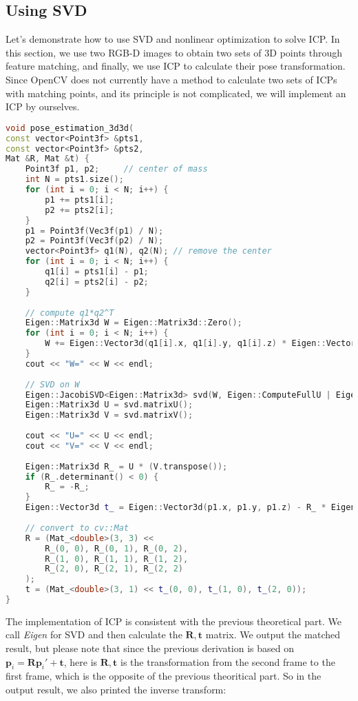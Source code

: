 \subsection{Using SVD}
Let's demonstrate how to use SVD and nonlinear optimization to solve ICP. In this section, we use two RGB-D images to obtain two sets of 3D points through feature matching, and finally, we use ICP to calculate their pose transformation. Since OpenCV does not currently have a method to calculate two sets of ICPs with matching points, and its principle is not complicated, we will implement an ICP by ourselves.
\begin{lstlisting}[language=c++,caption=slambook2/ch7/pose\_estimation\_3d3d.cpp (part)]
void pose_estimation_3d3d(
const vector<Point3f> &pts1,
const vector<Point3f> &pts2,
Mat &R, Mat &t) {
	Point3f p1, p2;     // center of mass
	int N = pts1.size();
	for (int i = 0; i < N; i++) {
		p1 += pts1[i];
		p2 += pts2[i];
	}
	p1 = Point3f(Vec3f(p1) / N);
	p2 = Point3f(Vec3f(p2) / N);
	vector<Point3f> q1(N), q2(N); // remove the center
	for (int i = 0; i < N; i++) {
		q1[i] = pts1[i] - p1;
		q2[i] = pts2[i] - p2;
	}
	
	// compute q1*q2^T
	Eigen::Matrix3d W = Eigen::Matrix3d::Zero();
	for (int i = 0; i < N; i++) {
		W += Eigen::Vector3d(q1[i].x, q1[i].y, q1[i].z) * Eigen::Vector3d(q2[i].x, q2[i].y, q2[i].z).transpose();
	}
	cout << "W=" << W << endl;
	
	// SVD on W
	Eigen::JacobiSVD<Eigen::Matrix3d> svd(W, Eigen::ComputeFullU | Eigen::ComputeFullV);
	Eigen::Matrix3d U = svd.matrixU();
	Eigen::Matrix3d V = svd.matrixV();
	
	cout << "U=" << U << endl;
	cout << "V=" << V << endl;
	
	Eigen::Matrix3d R_ = U * (V.transpose());
	if (R_.determinant() < 0) {
		R_ = -R_;
	}
	Eigen::Vector3d t_ = Eigen::Vector3d(p1.x, p1.y, p1.z) - R_ * Eigen::Vector3d(p2.x, p2.y, p2.z);
	
	// convert to cv::Mat
	R = (Mat_<double>(3, 3) <<
		R_(0, 0), R_(0, 1), R_(0, 2),
		R_(1, 0), R_(1, 1), R_(1, 2),
		R_(2, 0), R_(2, 1), R_(2, 2)
	);
	t = (Mat_<double>(3, 1) << t_(0, 0), t_(1, 0), t_(2, 0));
}
\end{lstlisting}

The implementation of ICP is consistent with the previous theoretical part. We call \textit{Eigen} for SVD and then calculate the $\mathbf{R}, \mathbf{t}$ matrix. We output the matched result, but please note that since the previous derivation is based on $\mathbf{p}_i = \mathbf{R} \mathbf{p}_i' + \mathbf{t}$, here is $\mathbf{R}, \mathbf{t}$ is the transformation from the second frame to the first frame, which is the opposite of the previous theoritical part. So in the output result, we also printed the inverse transform:

